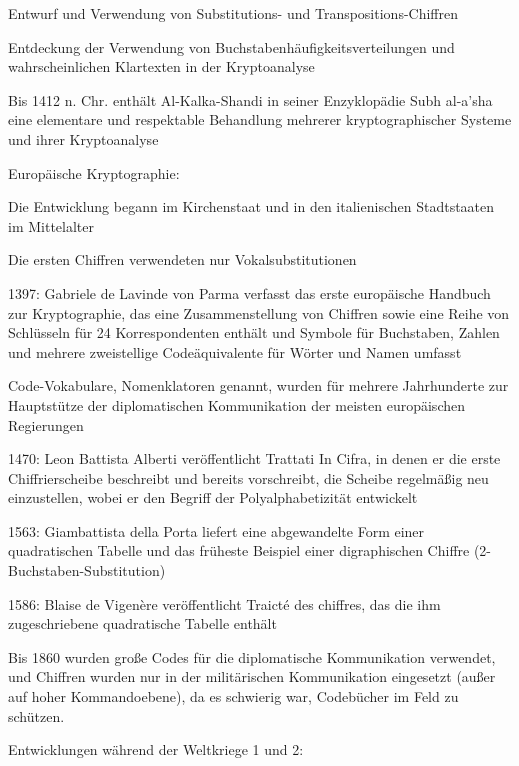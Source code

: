 \documentclass[a4paper]{article}
\begin{document}
\begin{multicols}{3}
\begin{itemize*}
            \begin{itemize*}
                  \item Entwurf und Verwendung von Substitutions- und Transpositions-Chiffren
                  \item Entdeckung der Verwendung von Buchstabenhäufigkeitsverteilungen und wahrscheinlichen Klartexten in der Kryptoanalyse
                  \item Bis 1412 n. Chr. enthält Al-Kalka-Shandi in seiner Enzyklopädie Subh al-a'sha eine elementare und respektable Behandlung mehrerer kryptographischer Systeme und ihrer Kryptoanalyse
            \end{itemize*}
            \item
            Europäische Kryptographie:

            \begin{itemize*}
                  \item Die Entwicklung begann im Kirchenstaat und in den italienischen Stadtstaaten im Mittelalter
                  \item Die ersten Chiffren verwendeten nur Vokalsubstitutionen
                  \item 1397: Gabriele de Lavinde von Parma verfasst das erste europäische Handbuch zur Kryptographie, das eine Zusammenstellung von Chiffren sowie eine Reihe von Schlüsseln für 24 Korrespondenten enthält und Symbole für Buchstaben, Zahlen und mehrere zweistellige Codeäquivalente für Wörter und Namen umfasst
                  \item Code-Vokabulare, Nomenklatoren genannt, wurden für mehrere Jahrhunderte zur Hauptstütze der diplomatischen Kommunikation der meisten europäischen Regierungen
                  \item 1470: Leon Battista Alberti veröffentlicht Trattati In Cifra, in denen er die erste Chiffrierscheibe beschreibt und bereits vorschreibt, die Scheibe regelmäßig neu einzustellen, wobei er den Begriff der Polyalphabetizität entwickelt
                  \item 1563: Giambattista della Porta liefert eine abgewandelte Form einer quadratischen Tabelle und das früheste Beispiel einer digraphischen Chiffre (2-Buchstaben-Substitution)
                  \item 1586: Blaise de Vigenère veröffentlicht Traicté des chiffres, das die ihm zugeschriebene quadratische Tabelle enthält
                  \item Bis 1860 wurden große Codes für die diplomatische Kommunikation verwendet, und Chiffren wurden nur in der militärischen Kommunikation eingesetzt (außer auf hoher Kommandoebene), da es schwierig war, Codebücher im Feld zu schützen.
            \end{itemize*}
            \item
            Entwicklungen während der Weltkriege 1 und 2:


\end{itemize*}
\end{multicols}
\end{document}
